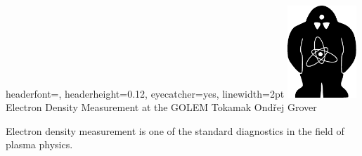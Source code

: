 \documentclass[portrait,final,a0paper]{baposter}
\begin{document}
\begin{poster}
{%
  headerfont=\Large\textsf, %
  headerheight=0.12\textheight,%
  eyecatcher=yes,
  linewidth=2pt
  }
  {\includegraphics[width=7em]{golem.pdf}} %
  {%
  \sc\huge Electron Density Measurement at the GOLEM Tokamak \vspace{ 0.2cm}}
  {Ondřej Grover
}{
}


{
Electron density measurement is one of the standard diagnostics in the field of plasma physics. 

}
\end{poster}
\end{document}
